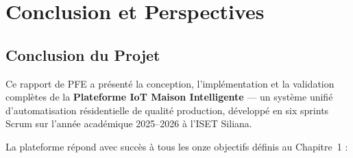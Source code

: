 \chapter{Conclusion et Perspectives}

\section{Conclusion du Projet}

Ce rapport de PFE a présenté la conception, l'implémentation et la validation complètes
de la \textbf{Plateforme IoT Maison Intelligente} --- un système unifié d'automatisation
résidentielle de qualité production, développé en six sprints Scrum sur l'année
académique 2025--2026 à l'ISET Siliana.

La plateforme répond avec succès à tous les onze objectifs définis au Chapitre~1 :

